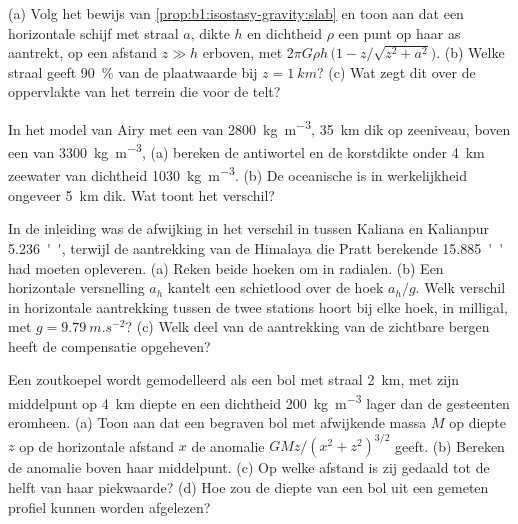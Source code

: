 \begin{exercise}[$\star\star$]\label{exo:b1:isostasy-gravity:7}
(a) Volg het bewijs van \cref{prop:b1:isostasy-gravity:slab} en toon aan dat een horizontale schijf met straal $a$, dikte $h$ en dichtheid $\rho$ een punt op haar as aantrekt, op een afstand $z \gg h$ erboven, met $2\pi G\rho h\,\bigl(1 -
z/\sqrt{z^2 + a^2}\bigr)$. (b) Welke straal geeft \qty{90}{\percent} van de plaatwaarde bij $z = \qty{1}{km}$? (c) Wat zegt dit over de oppervlakte van het terrein die voor de  telt?
\end{exercise}

\begin{exercise}[$\star\star$]\label{exo:b1:isostasy-gravity:8}
In het model van Airy met een  van \qty{2800}{kg.m^{-3}}, \qty{35}{km} dik op zeeniveau, boven een  van \qty{3300}{kg.m^{-3}}, (a) bereken de antiwortel en de korstdikte onder \qty{4}{km} zeewater van dichtheid \qty{1030}{kg.m^{-3}}. (b) De oceanische  is in werkelijkheid ongeveer \qty{5}{km} dik. Wat toont het verschil? %
\end{exercise}

\begin{exercise}[$\star\star$]\label{exo:b1:isostasy-gravity:9}
In de inleiding was de afwijking in het verschil in  tussen Kaliana en Kalianpur \qty{5.236}{''}, terwijl de aantrekking van de Himalaya die Pratt berekende \qty{15.885}{''} had moeten opleveren. (a) Reken beide hoeken om in radialen. (b) Een horizontale versnelling $a_h$ kantelt een schietlood over de hoek $a_h/g$. Welk verschil in horizontale aantrekking tussen de twee stations hoort bij elke hoek, in milligal, met $g = \qty{9.79}{m.s^{-2}}$? (c) Welk deel van de aantrekking van de zichtbare bergen heeft de compensatie opgeheven?
\end{exercise}

\begin{exercise}[$\star\star\star$]\label{exo:b1:isostasy-gravity:10}
Een zoutkoepel wordt gemodelleerd als een bol met straal \qty{2}{km}, met zijn middelpunt op \qty{4}{km} diepte en een dichtheid \qty{200}{kg.m^{-3}} lager dan de gesteenten eromheen. (a) Toon aan dat een begraven bol met afwijkende massa $M$ op diepte $z$ op de horizontale afstand $x$ de anomalie $GMz/(x^2 + z^2)^{3/2}$ geeft. (b) Bereken de anomalie boven haar middelpunt. (c) Op welke afstand is zij gedaald tot de helft van haar piekwaarde? (d) Hoe zou de diepte van een bol uit een gemeten profiel kunnen worden afgelezen?
\end{exercise}

